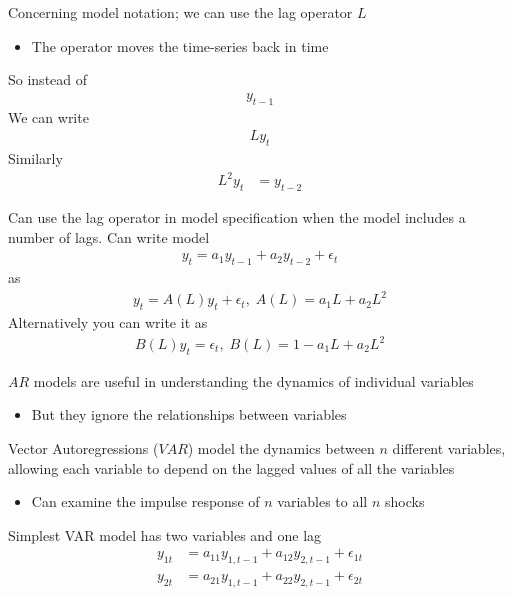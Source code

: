 \documentclass{beamer}
\begin{document}
\begin{frame}
  Concerning model notation; we can use the lag operator $L$
  \begin{itemize}
    \item The operator moves the time-series back in time
  \end{itemize}
  So instead of 
  \begin{align}
      y_{t-1}
    \end{align}
    \medskip
    We can write
    \begin{align}
        Ly_t
      \end{align}
    \medskip
    Similarly
    \begin{align}
       L^2y_t &= y_{t-2}
      \end{align}  
\end{frame}

\begin{frame}
 Can use the lag operator in model specification when the model includes a number of lags.
 Can write model 
  \begin{align}
    y_t = a_1 y_{t-1} + a_2 y_{t-2} + \epsilon_t
  \end{align}
  \medskip
  as
  \begin{align}
    y_t = A(L)y_t + \epsilon_t, \; A(L) = a_1 L + a_2 L^2
  \end{align}
  \medskip
  Alternatively you can write it as
  \begin{align}
    B(L)y_t = \epsilon_t,\; B(L) = 1-a_1 L + a_2 L^2
  \end{align}  
\end{frame}

\begin{frame}
  $AR$ models are useful in understanding the dynamics of individual variables
  \begin{itemize}
    \item But they ignore the relationships between variables
  \end{itemize}
  Vector Autoregressions ($VAR$) model the dynamics between $n$ different variables, allowing each variable to depend on the lagged values of all the variables
  \begin{itemize}
    \item Can examine the impulse response of $n$ variables to all $n$ shocks
  \end{itemize}
  \medskip
  Simplest VAR model has two variables and one lag
  \begin{align}
    y_{1t} &= a_11 y_{1, t-1} + a_12 y_{2,t-1} + \epsilon_{1t}\\
    y_{2t} &= a_21 y_{1, t-1} + a_22 y_{2,t-1} + \epsilon_{2t}
  \end{align}
\end{frame}
\end{document}
